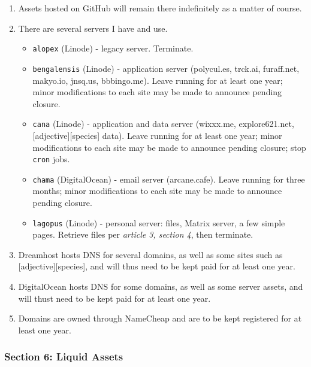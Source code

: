 \begin{enumerate}
\def\labelenumi{\arabic{enumi}.}
\tightlist
\item
  Assets hosted on GitHub will remain there indefinitely as a matter of course.
\item
  There are several servers I have and use.

  \begin{itemize}
  \tightlist
  \item
    \texttt{alopex} (Linode) - legacy server. Terminate.
  \item
    \texttt{bengalensis} (Linode) - application server (polycul.es, trck.ai, furaff.net, makyo.io, jnsq.us, bbbingo.me). Leave running for at least one year; minor modifications to each site may be made to announce pending closure.
  \item
    \texttt{cana} (Linode) - application and data server (wixxx.me, explore621.net, {[}adjective{]}{[}species{]} data). Leave running for at least one year; minor modifications to each site may be made to announce pending closure; stop \texttt{cron} jobs.
  \item
    \texttt{chama} (DigitalOcean) - email server (arcane.cafe). Leave running for three months; minor modifications to each site may be made to announce pending closure.
  \item
    \texttt{lagopus} (Linode) - personal server: files, Matrix server, a few simple pages. Retrieve files per \emph{article 3, section 4}, then terminate.
  \end{itemize}
\item
  Dreamhost hosts DNS for several domains, as well as some sites such as {[}adjective{]}{[}species{]}, and will thus need to be kept paid for at least one year.
\item
  DigitalOcean hosts DNS for some domains, as well as some server assets, and will thust need to be kept paid for at least one year.
\item
  Domains are owned through NameCheap and are to be kept registered for at least one year.
\end{enumerate}

\subsubsection*{Section 6: Liquid Assets}\label{section-6-liquid-assets}

